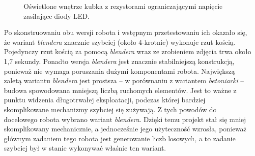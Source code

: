 \begin{figure}[H]
\begin{minipage}{0.48\textwidth}
        \caption{\label{fig:w sam raz}Oświetlone wnętrze kubka z rezystorami ograniczającymi napięcie zasilające diody LED.}
    \end{minipage}
\end{figure}

Po skonstruowaniu obu wersji robota i wstępnym przetestowaniu ich okazało się, że wariant \textit{blendera} znacznie szybciej (około 4-krotnie) wykonuje rzut kością.
Pojedynczy rzut kością za pomocą \textit{blendera} wraz ze zrobieniem zdjęcia trwa około 1,7 sekundy.
Ponadto wersja \textit{blendera} jest znacznie stabilniejszą konstrukcją, ponieważ nie wymaga poruszania dużymi komponentami robota. 
Największą zaletą wariantu \textit{blendera} jest prostsza -- w porównaniu z wariantem \textit{betoniarki} -- budowa spowodowana mniejszą liczbą ruchomych elementów. Jest to ważne z punktu widzenia
długotrwałej eksploatacji, podczas której bardziej skomplikowane mechanizmy szybciej się zużywają. Z tych powodów do docelowego robota wybrano
wariant \textit{blendera}. Dzięki temu projekt stał się mniej skomplikowany mechanicznie, a jednocześnie jego użyteczność wzrosła, ponieważ
głównym zadaniem tego robota jest generowanie liczb losowych, a to zadanie szybciej był w stanie wykonywać właśnie ten wariant.


